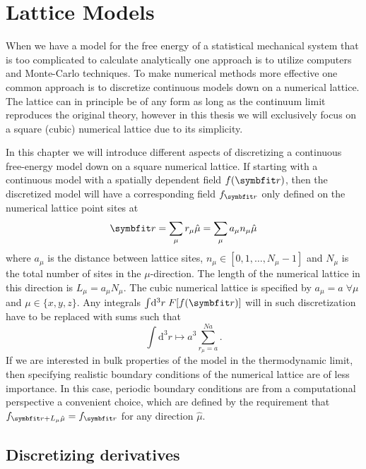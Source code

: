 \chapter{Lattice Models}
\label{sec:LM}

When we have a model for the free energy of a statistical mechanical system that is too complicated to
calculate analytically one approach is to utilize computers and Monte-Carlo techniques. To make numerical
methods more effective one common approach is to discretize continuous models down on a 
numerical lattice. The lattice can in principle be of any form as long as the continuum limit reproduces
the original theory, however in this thesis we will exclusively focus on a square (cubic) numerical lattice
due to its simplicity.

In this chapter we will introduce different aspects of discretizing a continuous free-energy model down
on a square numerical lattice. If starting with a continuous model with a spatially dependent field
$f(\v{r})$, then the discretized model will have a corresponding field $f_\v{r}$ only defined on the
numerical lattice point sites at
\begin{equation}
    \label{eq:LM:latticeSites}
    \v{r} = \sum_\mu r_\mu\hat{\mu} = \sum_\mu a_\mu n_\mu\hat{\mu}
\end{equation}
where $a_\mu$ is the distance between lattice sites, $n_\mu\in[0,1,\ldots,N_\mu-1]$ and $N_\mu$ is the total number of sites in the $\mu$-direction.
The length of the numerical lattice in this direction is $L_\mu = a_\mu N_\mu$. The cubic numerical lattice
is specified by $a_\mu = a\;\forall\mu$ and $\mu\in\{x,y,z\}$.
Any integrals $\int\!\mathrm{d}^3r\;F[f(\v{r})]$ will
in such discretization have to be replaced with sums such that
\begin{equation}
    \label{eq:LM:integrals}
    \int\!\mathrm{d}^3r \mapsto a^3\sum_{r_\mu=a}^{Na}.
\end{equation}
If we are interested in bulk properties of the model in the thermodynamic limit, then specifying realistic
boundary conditions of the numerical lattice are of less importance. In this case, periodic boundary conditions
are from a computational perspective a convenient choice, which are defined by the requirement that
$f_{\v{r}+L_\mu\hat{\mu}} = f_\v{r}$ for any direction $\hat{\mu}$.

\section{Discretizing derivatives}

